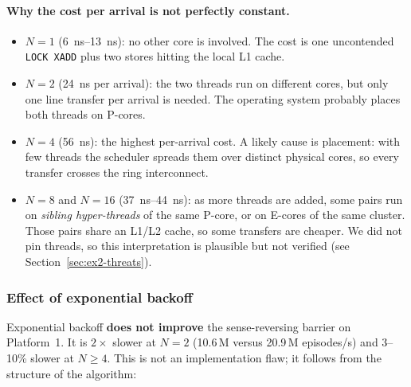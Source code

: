 \paragraph{Why the cost per arrival is not perfectly constant.}
\begin{itemize}
    \item $N=1$ (\SIrange{6}{13}{\nano\second}): no other core is involved.
          The cost is one uncontended \texttt{LOCK XADD} plus two stores
          hitting the local L1 cache.
    \item $N=2$ (\SI{24}{\nano\second} per arrival): the two threads run on
          different cores, but only one line transfer per arrival is
          needed. The operating system probably places both threads on
          P-cores.
    \item $N=4$ (\SI{56}{\nano\second}): the highest per-arrival cost.
          A likely cause is placement: with few threads the scheduler
          spreads them over distinct physical cores, so every transfer
          crosses the ring interconnect.
    \item $N=8$ and $N=16$ (\SIrange{37}{44}{\nano\second}): as more threads
          are added, some pairs run on \emph{sibling hyper-threads} of the
          same P-core, or on E-cores of the same cluster. Those pairs share
          an L1/L2 cache, so some transfers are cheaper. We did not pin
          threads, so this interpretation is plausible but not verified
          (see Section~\ref{sec:ex2-threats}).
\end{itemize}

\subsubsection{Effect of exponential backoff}

Exponential backoff \textbf{does not improve} the sense-reversing barrier
on Platform~1. It is $2\times$ slower at $N=2$ (10.6\,M versus 20.9\,M
episodes/s) and 3--10\% slower at $N \geq 4$. This is not an implementation
flaw; it follows from the structure of the algorithm:

